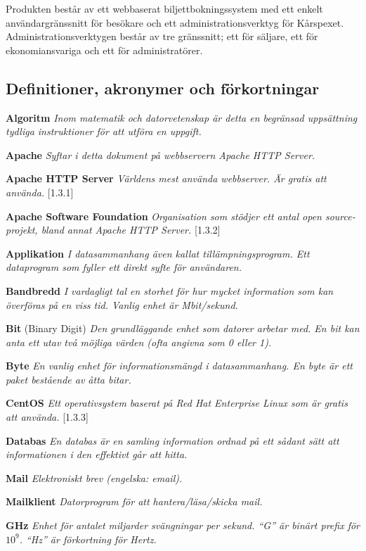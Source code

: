 \documentclass[a4paper, twoside, 11pt, titlepage]{article}
\begin{document}
	Produkten består av ett webbaserat biljettbokningssystem med ett enkelt användargränssnitt för besökare och ett administrationsverktyg för Kårspexet. Administrationsverktygen består av tre gränssnitt; ett för säljare, ett för ekonomiansvariga och ett för administratörer.

	\subsection{Definitioner, akronymer och förkortningar}


	\textbf{Algoritm} \emph{Inom matematik och datorvetenskap är detta en begränsad uppsättning tydliga instruktioner för att utföra en uppgift.}

	\textbf{Apache} \emph{Syftar i detta dokument på webbservern  Apache HTTP Server.}

	\textbf{Apache HTTP Server} \emph{Världens mest använda webbserver. Är gratis att använda.} [1.3.1]

	\textbf{Apache Software Foundation} \emph{Organisation som stödjer ett antal open source-projekt, bland annat Apache HTTP Server.} [1.3.2]

	\textbf{Applikation} \emph{I datasammanhang även kallat tillämpningsprogram. Ett dataprogram som fyller ett direkt syfte för användaren.}

	\textbf{Bandbredd} \emph{I vardagligt tal en storhet för hur mycket information som kan överföras på en viss tid. Vanlig enhet är Mbit/sekund.}

	\textbf{Bit} (Binary Digit) \emph{Den grundläggande enhet som datorer arbetar med. En bit kan anta ett utav två möjliga värden (ofta angivna som 0 eller 1).}

	\textbf{Byte} \emph{En vanlig enhet för informationsmängd i datasammanhang. En byte är ett paket bestående av åtta bitar.}

	\textbf{CentOS} \emph{Ett operativsystem baserat på Red Hat Enterprise Linux som är gratis att använda.} [1.3.3]

	\textbf{Databas} \emph{En databas är en samling information ordnad på ett sådant sätt att informationen i den effektivt går att hitta.}

	\textbf{Mail} \emph{Elektroniskt brev (engelska: email).}

	\textbf{Mailklient} \emph{Datorprogram för att hantera/läsa/skicka mail.}

	\textbf{GHz} \emph{Enhet för antalet miljarder svängningar per sekund. ``G'' är binärt prefix för $10^{9}$. ``Hz'' är förkortning för Hertz.}
\end{document}
